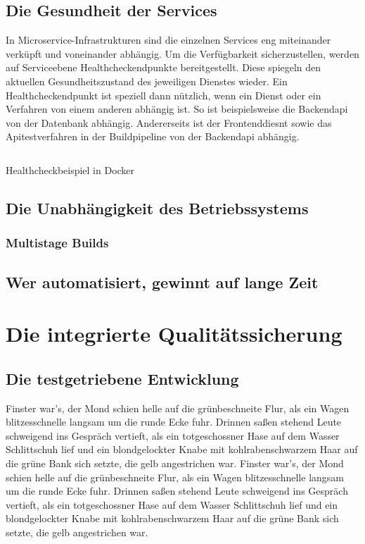 \section{Die Gesundheit der Services}
In Microservice-Infrastrukturen sind die einzelnen Services eng miteinander verküpft
und voneinander abhängig. Um die Verfügbarkeit sicherzustellen, werden auf
Serviceebene Healthcheckendpunkte bereitgestellt. Diese spiegeln den aktuellen
Gesundheitszustand des jeweiligen Dienstes wieder. Ein Healthcheckendpunkt
ist speziell dann nützlich, wenn ein Dienst oder ein Verfahren von einem anderen
abhängig ist. So ist beispielsweise die Backendapi von der Datenbank
abhängig. Andererseits ist der Frontenddiesnt sowie das Apitestverfahren
in der Buildpipeline von der Backendapi abhängig. 

\begin{listing}
    \label{lst:healthcheck}
    \inputminted{sh}{snippets/sh/healthcheck.sh}
    \caption{Healthcheckbeispiel in Docker}
\end{listing}

\section{Die Unabhängigkeit des Betriebssystems}
\subsection{Multistage Builds}

\section{Wer automatisiert, gewinnt auf lange Zeit}

\chapter{Die integrierte Qualitätssicherung}

\section{Die testgetriebene Entwicklung}

Finster war's, der Mond schien helle auf die grünbeschneite Flur, als
ein Wagen blitzesschnelle langsam um die runde Ecke fuhr. Drinnen
saßen stehend Leute schweigend ins Gespräch vertieft, als ein
totgeschossner Hase auf dem Wasser Schlittschuh lief und ein
blondgelockter Knabe mit kohlrabenschwarzem Haar auf die grüne Bank
sich setzte, die gelb angestrichen war.
Finster war's, der Mond schien helle auf die grünbeschneite Flur, als
ein Wagen blitzesschnelle langsam um die runde Ecke fuhr. Drinnen
saßen stehend Leute schweigend ins Gespräch vertieft, als ein
totgeschossner Hase auf dem Wasser Schlittschuh lief und ein
blondgelockter Knabe mit kohlrabenschwarzem Haar auf die grüne Bank
sich setzte, die gelb angestrichen war.

